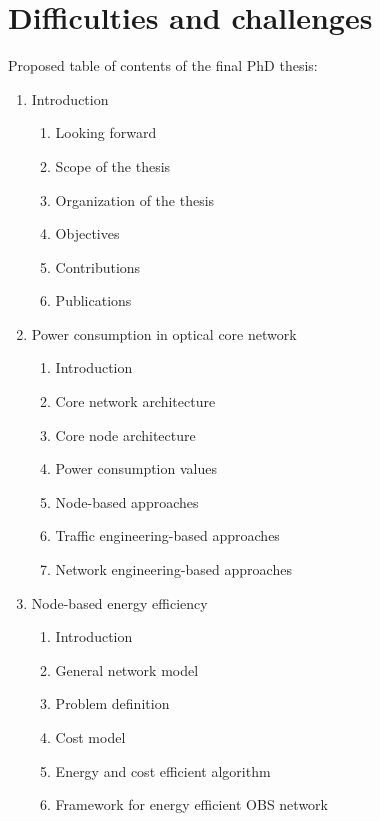 \documentclass{article}
\begin{document}
\section{Difficulties and challenges} 
%
%      


\appendix
Proposed table of contents of the final PhD thesis:
\begin{enumerate}
\item Introduction
\begin{enumerate}[i]
\item Looking forward
\item Scope of the thesis
\item Organization of the thesis
\item Objectives
\item Contributions
\item Publications 
\end{enumerate}
\item Power consumption in optical core network
\begin{enumerate}[i]
\item Introduction
\item Core network architecture
\item Core node architecture 
\item Power consumption values
\item Node-based approaches
\item Traffic engineering-based approaches
\item Network engineering-based approaches
\end{enumerate}
\item Node-based energy efficiency
\begin{enumerate}[i]
\item Introduction
\item General network model
\item Problem definition
\item Cost model
\item Energy and cost efficient algorithm
\item Framework for energy efficient OBS network

\end{enumerate}
\end{enumerate}
\end{document}
